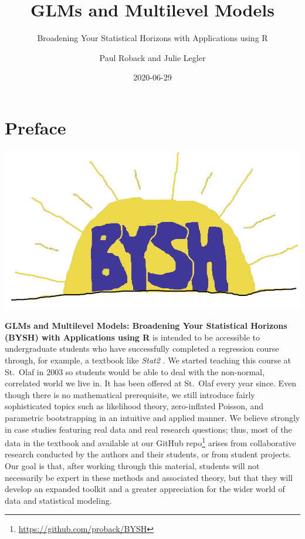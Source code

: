 \documentclass[
]{krantz}
\title{GLMs and Multilevel Models}
\subtitle{Broadening Your Statistical Horizons with Applications using R}
\author{Paul Roback and Julie Legler}
\date{2020-06-29}
\renewcommand{\href}[2]{#2\footnote{\url{#1}}}
\begin{document}
\maketitle


\thispagestyle{empty}

\setlength{\abovedisplayskip}{-5pt}
\setlength{\abovedisplayshortskip}{-5pt}

{
\hypersetup{linkcolor=}
\setcounter{tocdepth}{2}
\tableofcontents
}
\mainmatter

\hypertarget{preface}{%
\chapter*{Preface}\label{preface}}


\includegraphics[width=0.75\linewidth]{data/cover}

\textbf{GLMs and Multilevel Models: Broadening Your Statistical Horizons (BYSH) with Applications using R} is intended to be accessible to undergraduate students who have successfully completed a regression course through, for example, a textbook like \emph{Stat2} \citep{Cannon2019}. We started teaching this course at St.~Olaf in 2003 so students would be able to deal with the non-normal, correlated world we live in. It has been offered at St.~Olaf every year since. Even though there is no mathematical prerequisite, we still introduce fairly sophisticated topics such as likelihood theory, zero-inflated Poisson, and parametric bootstrapping in an intuitive and applied manner. We believe strongly in case studies featuring real data and real research questions; thus, most of the data in the textbook and \href{https://github.com/proback/BYSH}{available at our GitHub repo} arises from collaborative research conducted by the authors and their students, or from student projects. Our goal is that, after working through this material, students will not necessarily be expert in these methods and associated theory, but that they will develop an expanded toolkit and a greater appreciation for the wider world of data and statistical modeling.
\end{document}
